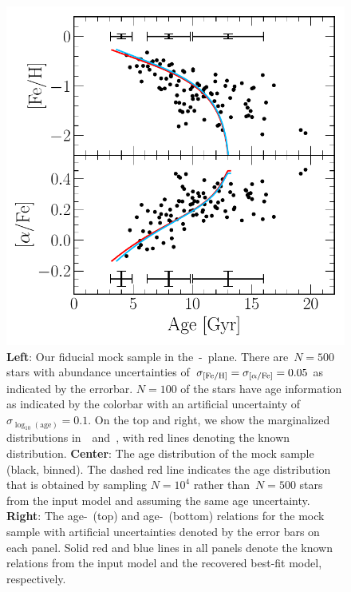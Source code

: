 \documentclass[ms.tex]{subfiles}
\begin{document}
\begin{figure}
\includegraphics[scale = 0.41]{fiducial_mock_amr.pdf}
\caption{
\textbf{Left}: Our fiducial mock sample in the~\afe-\feh~plane.
There are~$N = 500$ stars with abundance uncertainties of~$\sigma_{\text{[Fe/H]}} =
\sigma_{\text{[$\alpha$/Fe]}} = 0.05$ as indicated by the errorbar.
$N = 100$ of the stars have age information as indicated by the colorbar with
an artificial uncertainty of~$\sigma_{\log_{10}(\text{age})} = 0.1$.
On the top and right, we show the marginalized distributions in~\afe~and~\feh,
with red lines denoting the known distribution.
\textbf{Center}: The age distribution of the mock sample (black, binned).
The dashed red line indicates the age distribution that is obtained by sampling
$N = 10^4$ rather than~$N = 500$ stars from the input model and assuming the
same age uncertainty.
\textbf{Right}: The age-\feh~(top) and age-\afe~(bottom) relations for the
mock sample with artificial uncertainties denoted by the error bars on each
panel.
Solid red and blue lines in all panels denote the known relations from the
input model and the recovered best-fit model, respectively.
}
\label{fig:fiducial_mock}
\end{figure}
\end{document}
